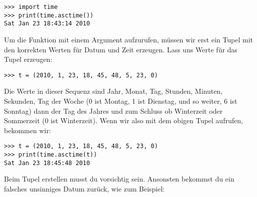 \begin{Verbatim}[frame=single]
>>> import time
>>> print(time.asctime())
Sat Jan 23 18:43:14 2010
\end{Verbatim}


\noindent
Um die Funktion mit einem Argument aufzurufen, müssen wir erst ein Tupel mit den korrekten Werten für Datum und Zeit erzeugen. Lass uns Werte für das Tupel  erzeugen:

\begin{Verbatim}[frame=single]
>>> t = (2010, 1, 23, 18, 45, 48, 5, 23, 0)
\end{Verbatim}

\noindent
Die Werte in dieser Sequenz sind Jahr, Monat, Tag, Stunden, Minuten, Sekunden, Tag der Woche (0 ist Montag, 1 ist Dienstag, und so weiter, 6 ist Sonntag) dann der Tag des Jahres und zum Schluss ob Winterzeit oder Sommerzeit (0 ist Winterzeit). Wenn wir also  mit dem obigen Tupel aufrufen, bekommen wir: 

\begin{Verbatim}[frame=single]
>>> t = (2010, 1, 23, 18, 45, 48, 5, 23, 0)
>>> print(time.asctime(t))
Sat Jan 23 18:45:48 2010
\end{Verbatim}

\noindent
Beim Tupel erstellen musst du vorsichtig sein. Ansonsten bekommst du ein falsches unsinniges Datum zurück, wie zum Beispiel:

